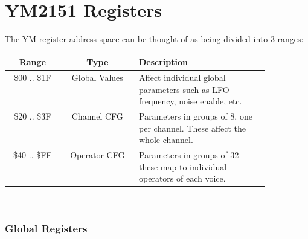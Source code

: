 \chapter*{YM2151 Registers}

The YM register address space can be thought of as being divided into 3 ranges:\\

\begin{tabular}{|c|c|p{0.5\linewidth}|}
	\hline
	Range & Type & Description \\ \hline
	\$00 .. \$1F & Global Values & Affect individual global parameters such as LFO frequency, noise enable, etc. \\ \hline
	\$20 .. \$3F & Channel CFG & Parameters in groups of 8, one per channel. These affect the whole channel. \\ \hline
	\$40 .. \$FF & Operator CFG & Parameters in groups of 32 - these map to individual operators of each voice. \\ \hline
\end{tabular}\\

\subsection{Global Registers}

